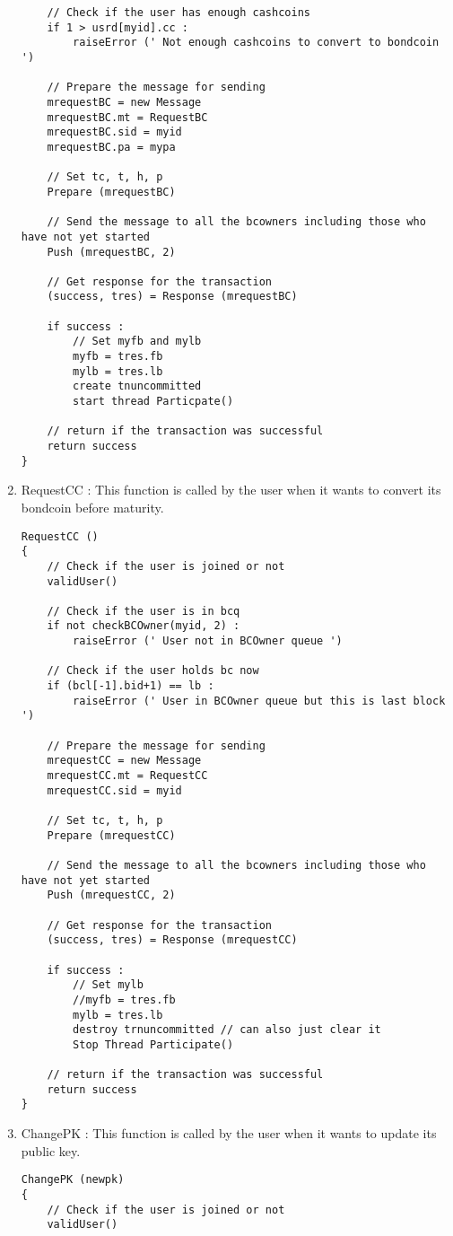 \begin{enumerate}
\begin{lstlisting}
    // Check if the user has enough cashcoins
    if 1 > usrd[myid].cc :
        raiseError (' Not enough cashcoins to convert to bondcoin ')

    // Prepare the message for sending
    mrequestBC = new Message
    mrequestBC.mt = RequestBC
    mrequestBC.sid = myid
    mrequestBC.pa = mypa

    // Set tc, t, h, p
    Prepare (mrequestBC)

    // Send the message to all the bcowners including those who have not yet started
    Push (mrequestBC, 2)

    // Get response for the transaction
    (success, tres) = Response (mrequestBC)

    if success :
        // Set myfb and mylb
        myfb = tres.fb
        mylb = tres.lb
        create tnuncommitted
        start thread Particpate()

    // return if the transaction was successful
    return success
}
    \end{lstlisting}
    \item RequestCC : This function is called by the user when it wants to convert its bondcoin before maturity.
    \begin{lstlisting}
RequestCC ()
{
    // Check if the user is joined or not
    validUser()

    // Check if the user is in bcq
    if not checkBCOwner(myid, 2) :
        raiseError (' User not in BCOwner queue ')

    // Check if the user holds bc now
    if (bcl[-1].bid+1) == lb :
        raiseError (' User in BCOwner queue but this is last block ')
    
    // Prepare the message for sending
    mrequestCC = new Message
    mrequestCC.mt = RequestCC
    mrequestCC.sid = myid
    
    // Set tc, t, h, p
    Prepare (mrequestCC)

    // Send the message to all the bcowners including those who have not yet started
    Push (mrequestCC, 2)

    // Get response for the transaction
    (success, tres) = Response (mrequestCC)

    if success :
        // Set mylb
        //myfb = tres.fb
        mylb = tres.lb
        destroy trnuncommitted // can also just clear it
        Stop Thread Participate()

    // return if the transaction was successful
    return success
}
    \end{lstlisting}
    \item ChangePK : This function is called by the user when it wants to update its public key.
    \begin{lstlisting}
ChangePK (newpk)
{
    // Check if the user is joined or not
    validUser()


\end{lstlisting}
\end{enumerate}
